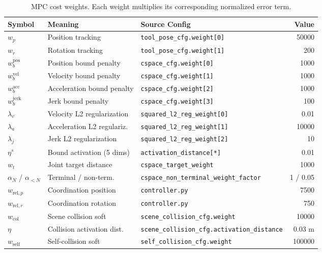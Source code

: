 \documentclass[11pt,a4paper]{article}
\begin{document}
\begin{table}[h]
\centering
\caption{MPC cost weights. Each weight multiplies its corresponding normalized error term.}
\label{tab:weights}
\begin{tabular}{@{}lllr@{}}
\toprule
Symbol & Meaning & Source Config & Value \\
\midrule
$w_p$                & Position tracking           & \texttt{tool\_pose\_cfg.weight[0]}          & 50000  \\
$w_r$                & Rotation tracking           & \texttt{tool\_pose\_cfg.weight[1]}          & 200    \\
$w_b^{\text{pos}}$   & Position bound penalty      & \texttt{cspace\_cfg.weight[0]}              & 1000   \\
$w_b^{\text{vel}}$   & Velocity bound penalty      & \texttt{cspace\_cfg.weight[1]}              & 1000   \\
$w_b^{\text{acc}}$   & Acceleration bound penalty  & \texttt{cspace\_cfg.weight[2]}              & 1000   \\
$w_b^{\text{jerk}}$  & Jerk bound penalty          & \texttt{cspace\_cfg.weight[3]}              & 100    \\
$\lambda_v$          & Velocity L2 regularization  & \texttt{squared\_l2\_reg\_weight[0]}        & 0.01   \\
$\lambda_a$          & Acceleration L2 regulariz.  & \texttt{squared\_l2\_reg\_weight[1]}        & 10000  \\
$\lambda_j$          & Jerk L2 regularization      & \texttt{squared\_l2\_reg\_weight[2]}        & 10     \\
$\eta^s$             & Bound activation (5 dims)   & \texttt{activation\_distance[*]}             & 0.01   \\
$w_t$                & Joint target distance       & \texttt{cspace\_target\_weight}             & 1000   \\
$\alpha_N$ / $\alpha_{<N}$ & Terminal / non-term.    & \texttt{cspace\_non\_terminal\_weight\_factor} & 1 / 0.05 \\
$w_{\text{rel},p}$   & Coordination position        & \texttt{controller.py}                      & 7500 \\
$w_{\text{rel},r}$   & Coordination rotation        & \texttt{controller.py}                      & 750  \\
$w_{\text{col}}$     & Scene collision soft        & \texttt{scene\_collision\_cfg.weight}       & 10000  \\
$\eta$               & Collision activation dist.  & \texttt{scene\_collision\_cfg.activation\_distance} & 0.03 m \\
$w_{\text{self}}$    & Self-collision soft         & \texttt{self\_collision\_cfg.weight}        & 100000 \\
\bottomrule
\end{tabular}
\end{table}
\end{document}
